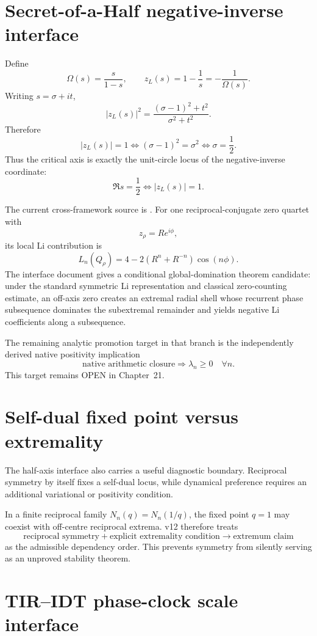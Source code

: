 \section{Secret-of-a-Half negative-inverse interface}

Define
\[
\Omega(s)=\frac{s}{1-s},
\qquad
z_L(s)=1-\frac1s=-\frac1{\Omega(s)}.
\]
Writing \(s=\sigma+it\),
\[
|z_L(s)|^2
=
\frac{(\sigma-1)^2+t^2}{\sigma^2+t^2}.
\]
Therefore
\[
|z_L(s)|=1
\iff
(\sigma-1)^2=\sigma^2
\iff
\boxed{\sigma=\frac12}.
\]
Thus the critical axis is exactly the unit-circle locus of the
negative-inverse coordinate:
\[
\boxed{
\Re s=\frac12
\iff
|z_L(s)|=1.
}
\]

The current cross-framework source is
.
For one reciprocal-conjugate zero quartet with
\[
z_\rho=Re^{i\phi},
\]
its local Li contribution is
\[
L_n(Q_\rho)
=4-2(R^n+R^{-n})\cos(n\phi).
\]
The interface document gives a conditional global-domination theorem candidate:
under the standard symmetric Li representation and classical zero-counting
estimate, an off-axis zero creates an extremal radial shell whose recurrent
phase subsequence dominates the subextremal remainder and yields negative Li
coefficients along a subsequence.

The remaining analytic promotion target in that branch is the independently
derived native positivity implication
\[
\boxed{
\text{native arithmetic closure}
\Longrightarrow
\lambda_n\ge0\quad\forall n.
}
\]
This target remains OPEN in Chapter~21.

\section{Self-dual fixed point versus extremality}

The half-axis interface also carries a useful diagnostic boundary.  Reciprocal
symmetry by itself fixes a self-dual locus, while dynamical preference requires
an additional variational or positivity condition.

In a finite reciprocal family \(N_n(q)=N_n(1/q)\), the fixed point \(q=1\) may
coexist with off-centre reciprocal extrema.  v12 therefore treats
\[
\boxed{
\text{reciprocal symmetry}
+\text{explicit extremality condition}
\to
\text{extremum claim}
}
\]
as the admissible dependency order.  This prevents symmetry from silently
serving as an unproved stability theorem.

\section{TIR--IDT phase-clock scale interface}

